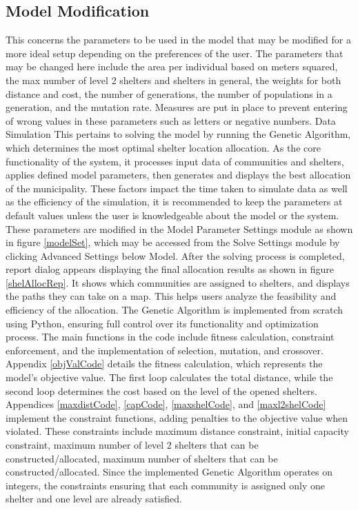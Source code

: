\documentclass[12pt,a4paper,]{article}
\begin{document}
	\subsection{Model Modification}
	This concerns the parameters to be used in the model that may be modified for a more ideal setup depending on the preferences of the user. The parameters that may be changed here include the area per individual based on meters squared, the max number of level 2 shelters and shelters in general, the weights for both distance and cost, the number of generations, the number of populations in a generation, and the mutation rate. Measures are put in place to prevent entering of wrong values in these parameters such as letters or negative numbers.
	Data Simulation
	This pertains to solving the model by running the Genetic Algorithm, which determines the most optimal shelter location allocation. As the core functionality of the system, it processes input data of communities and shelters, applies defined model parameters, then generates and displays the best allocation of the municipality.
	These factors impact the time taken to simulate data as well as the efficiency of the simulation, it is recommended to keep the parameters at default values unless the user is knowledgeable about the model or the system. These parameters are modified in the Model Parameter Settings module as shown in figure \ref{modelSet}, which may be accessed from the Solve Settings module by clicking Advanced Settings below Model.
	After the solving process is completed, report dialog appears displaying the final allocation results as shown in figure \ref{shelAllocRep}. It shows which communities are assigned to shelters, and displays the paths they can take on a map. This helps users analyze the feasibility and efficiency of the allocation.
	The Genetic Algorithm is implemented from scratch using Python, ensuring full control over its functionality and optimization process. The main functions in the code include fitness calculation, constraint enforcement, and the implementation of selection, mutation, and crossover.
	Appendix \ref{objValCode} details the fitness calculation, which represents the model's objective value. The first loop calculates the total distance, while the second loop determines the cost based on the level of the opened shelters.
	Appendices \ref{maxdistCode}, \ref{capCode}, \ref{maxshelCode}, and \ref{maxl2shelCode} implement the constraint functions, adding penalties to the objective value when violated. These constraints include maximum distance constraint, initial capacity constraint, maximum number of level 2 shelters that can be constructed/allocated, maximum number of shelters that can be constructed/allocated. Since the implemented Genetic Algorithm operates on integers, the constraints ensuring that each community is assigned only one shelter and one level are already satisfied.
\end{document}
